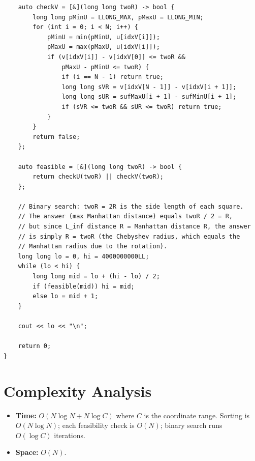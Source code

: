 \documentclass[11pt,a4paper]{article}
\begin{document}
\begin{lstlisting}
    auto checkV = [&](long long twoR) -> bool {
        long long pMinU = LLONG_MAX, pMaxU = LLONG_MIN;
        for (int i = 0; i < N; i++) {
            pMinU = min(pMinU, u[idxV[i]]);
            pMaxU = max(pMaxU, u[idxV[i]]);
            if (v[idxV[i]] - v[idxV[0]] <= twoR &&
                pMaxU - pMinU <= twoR) {
                if (i == N - 1) return true;
                long long sVR = v[idxV[N - 1]] - v[idxV[i + 1]];
                long long sUR = sufMaxU[i + 1] - sufMinU[i + 1];
                if (sVR <= twoR && sUR <= twoR) return true;
            }
        }
        return false;
    };

    auto feasible = [&](long long twoR) -> bool {
        return checkU(twoR) || checkV(twoR);
    };

    // Binary search: twoR = 2R is the side length of each square.
    // The answer (max Manhattan distance) equals twoR / 2 = R,
    // but since L_inf distance R = Manhattan distance R, the answer
    // is simply R = twoR (the Chebyshev radius, which equals the
    // Manhattan radius due to the rotation).
    long long lo = 0, hi = 4000000000LL;
    while (lo < hi) {
        long long mid = lo + (hi - lo) / 2;
        if (feasible(mid)) hi = mid;
        else lo = mid + 1;
    }

    cout << lo << "\n";

    return 0;
}
\end{lstlisting}

\section{Complexity Analysis}
\begin{itemize}
  \item \textbf{Time:} $O(N \log N + N \log C)$ where $C$ is the
        coordinate range. Sorting is $O(N \log N)$; each feasibility
        check is $O(N)$; binary search runs $O(\log C)$ iterations.
  \item \textbf{Space:} $O(N)$.
\end{itemize}
\end{document}
